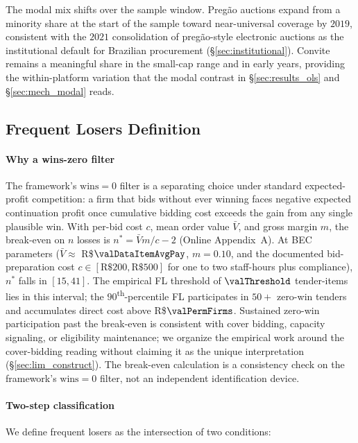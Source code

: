 The modal mix shifts over the sample window. Preg\~ao auctions
expand from a minority share at the start of the sample toward
near-universal coverage by $2019$, consistent with the $2021$
consolidation of preg\~ao-style electronic auctions as the
institutional default for Brazilian procurement
(§\ref{sec:institutional}). Convite remains a meaningful share
in the small-cap range and in early years, providing the
within-platform variation that the modal contrast in
§\ref{sec:results_ols} and §\ref{sec:mech_modal} reads.

\subsection{Frequent Losers Definition}
\label{sec:fl_definition}

\paragraph{Why a wins-zero filter}
The framework's $\text{wins}=0$ filter is a separating choice
under standard expected-profit competition: a firm that bids
without ever winning faces negative expected continuation profit
once cumulative bidding cost exceeds the gain from any single
plausible win. With per-bid cost $c$, mean order value
$\bar V$, and gross margin $m$, the break-even on $n$ losses is
$n^{*} = \bar V m / c - 2$ (Online Appendix~A). At BEC
parameters ($\bar V \approx$ R\$$\valDataItemAvgPay$, $m=0.10$,
and the documented bid-preparation cost $c \in [\text{R\$}200,
\text{R\$}500]$ for one to two staff-hours plus compliance),
$n^{*}$ falls in $[15, 41]$. The empirical FL threshold of
$\valThreshold$ tender-items lies in this interval; the
$90$\textsuperscript{th}-percentile FL participates in $50+$
zero-win tenders and accumulates direct cost above
R\$$\valPermFirms$. Sustained zero-win participation past the
break-even is consistent with cover bidding, capacity signaling,
or eligibility maintenance; we organize the empirical work
around the cover-bidding reading without claiming it as the
unique interpretation (§\ref{sec:lim_construct}). The break-even
calculation is a consistency check on the framework's
$\text{wins}=0$ filter, not an independent identification
device.

\paragraph{Two-step classification}
We define frequent losers as the intersection of two
conditions:

